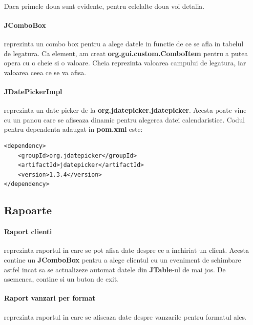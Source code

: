 \documentclass[oneside]{article}
\begin{document}
\paragraph{} Daca primele doua sunt evidente, pentru celelalte doua voi detalia.

\paragraph{JComboBox} reprezinta un combo box pentru a alege datele in functie de ce se afla in tabelul de legatura. Ca element, am creat \textbf{org.gui.custom.ComboItem} pentru a putea opera cu o cheie si o valoare. Cheia reprezinta valoarea campului de legatura, iar valoarea ceea ce se va afisa.

\paragraph{JDatePickerImpl} reprezinta un date picker de la \textbf{org.jdatepicker.jdatepicker}. Acesta poate vine cu un panou care se afiseaza dinamic pentru alegerea datei calendaristice. Codul pentru dependenta adaugat in \textbf{pom.xml} este:
\begin{center}
    \begin{lstlisting}[language=pom]
<dependency>
    <groupId>org.jdatepicker</groupId>
    <artifactId>jdatepicker</artifactId>
    <version>1.3.4</version>
</dependency>
    \end{lstlisting}
\end{center}

\subsection[Rapoarte]{Rapoarte}
\paragraph{Raport clienti} reprezinta raportul in care se pot afisa date despre ce a inchiriat un client. Acesta contine un \textbf{JComboBox} pentru a alege clientul cu un eveniment de schimbare astfel incat sa se actualizeze automat datele din \textbf{JTable}-ul de mai jos. De asemenea, contine si un buton de exit.

\paragraph{Raport vanzari per format} reprezinta raportul in care se afiseaza date despre vanzarile pentru formatul ales.
\end{document}
